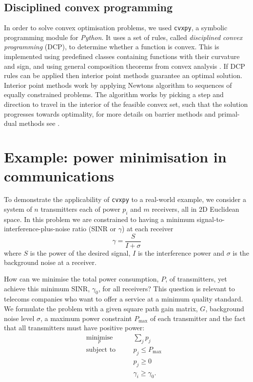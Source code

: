 \documentclass[twocolumn,secnumarabic,amssymb, nobibnotes, aps, prl,superscriptaddress]{revtex4-1}
\begin{document}
\subsection{Disciplined convex programming}
\noindent In order to solve convex optimisation problems, we used \texttt{cvxpy}, a symbolic programming module for \textit{Python}\cite{cvxpy}. It uses a set of rules, called \textit{disciplined convex programming} (DCP), to determine whether a function is convex. This is implemented using predefined classes containing functions with their curvature and sign, and using general composition theorems from convex analysis \cite{dcp}. If DCP rules can be applied then interior point methods guarantee an optimal solution. Interior point methods work by applying Newtons algorithm to sequences of equally constrained problems. The algorithm works by picking a step and direction to travel in the interior of the feasible convex set, such that the solution progresses towards optimality, for more details on barrier methods and primal-dual methods see \citep[p.561]{cvxpybook}.

\section{Example: power minimisation in communications}
\noindent To demonstrate the applicability of \texttt{cvxpy} to  a real-world example, we consider a system of $n$ transmitters each of power $p_i$ and $m$ receivers, all in $2$D Euclidean space\cite{shannon1949}. In this problem we are constrained to having a minimum signal-to-interference-plus-noise ratio (SINR or $\gamma$) at each receiver
\begin{equation}
\gamma =\frac{S}{I+\sigma}
\end{equation} 
where $S$ is the power of the desired signal, $I$ is the interference power and $\sigma$ is the background noise at a receiver. 

How can we minimise the total power consumption, $P$, of transmitters, yet achieve this minimum SINR, $\gamma_0$, for all receivers? This question is relevant to telecoms companies who want to offer a service at a minimum quality standard. We formulate the problem with a given square path gain matrix, $G$, background noise level $\sigma$, a maximum power constraint $P_{\text{max}}$ of each transmitter and the fact that all transmitters must have positive power:
\begin{align*}
&\underset{p}{\text{minimise}} \quad &&\sum_j p_j\\
&\text{subject to} \quad &&p_j \leq P_{\max}\\
& \quad &&p_j \geq 0\\
& \quad &&\gamma_i \geq \gamma_0.&&
\end{align*}
\end{document}
